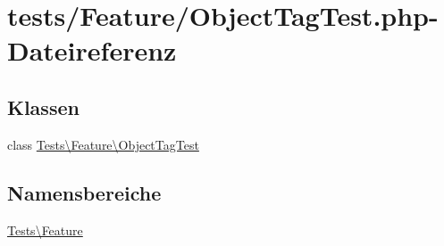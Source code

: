 \hypertarget{ObjectTagTest_8php}{}\section{tests/\+Feature/\+Object\+Tag\+Test.php-\/\+Dateireferenz}
\label{ObjectTagTest_8php}
\subsection*{Klassen}
\begin{DoxyCompactItemize}
\item 
class \hyperlink{classTests_1_1Feature_1_1ObjectTagTest}{Tests\textbackslash{}\+Feature\textbackslash{}\+Object\+Tag\+Test}
\end{DoxyCompactItemize}
\subsection*{Namensbereiche}
\begin{DoxyCompactItemize}
\item 
 \hyperlink{namespaceTests_1_1Feature}{Tests\textbackslash{}\+Feature}
\end{DoxyCompactItemize}
